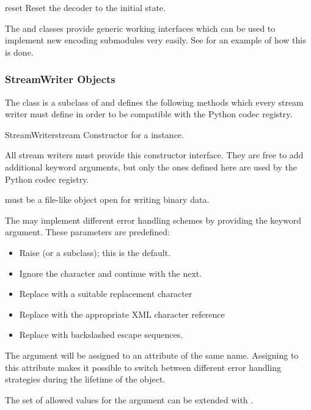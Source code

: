 \begin{methoddesc}{reset}{}
  Reset the decoder to the initial state.
\end{methoddesc}


The  and  classes provide
generic working interfaces which can be used to implement new
encoding submodules very easily. See  for an
example of how this is done.


\subsubsection{StreamWriter Objects \label{stream-writer-objects}}

The  class is a subclass of  and
defines the following methods which every stream writer must define in
order to be compatible with the Python codec registry.

\begin{classdesc}{StreamWriter}{stream}
  Constructor for a  instance. 

  All stream writers must provide this constructor interface. They are
  free to add additional keyword arguments, but only the ones defined
  here are used by the Python codec registry.

   must be a file-like object open for writing binary
  data.

  The  may implement different error handling
  schemes by providing the  keyword argument. These
  parameters are predefined:

  \begin{itemize}
    \item {} Raise  (or a subclass);
                          this is the default.
    \item {} Ignore the character and continue with the next.
    \item {} Replace with a suitable replacement character
    \item {} Replace with the appropriate XML
                     character reference
    \item {} Replace with backslashed escape sequences.
  \end{itemize}

  The  argument will be assigned to an attribute of the
  same name. Assigning to this attribute makes it possible to switch
  between different error handling strategies during the lifetime
  of the  object.

  The set of allowed values for the  argument can
  be extended with .
\end{classdesc}

